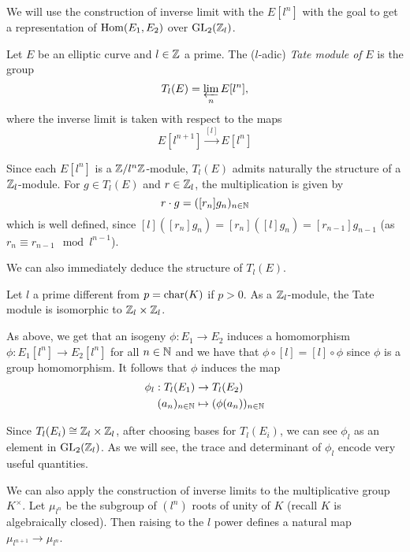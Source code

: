 We will use the construction of inverse limit with the $E[l^n]$
with the goal to get a representation of $\operatorname{Hom}(E_1, E_2)$ over
$\operatorname{GL}_2(\mathbb{Z}_l)$.


\begin{definition}
	Let $E$ be an elliptic curve and $l \in \mathbb{Z}$ a prime.
	The ($l$-adic) \emph{Tate module of} $E$ is the group
	\begin{equation*}
		T_l(E) = \varprojlim_n E[l^n],
	\end{equation*}
	where the inverse limit is taken with respect to the maps
	\begin{equation*}
		E[l^{n+1}]\xrightarrow{[l]} E[l^n]
	\end{equation*}
\end{definition}

Since each $E[l^n]$ is a $\mathbb{Z}/l^n\mathbb{Z}$-module, $T_l(E)$ admits naturally the
structure of a $\mathbb{Z}_l$-module. For $g \in T_l(E)$ and $r \in \mathbb{Z}_l$, the 
multiplication is given by
\begin{equation*}
	r \cdot g = ([r_n]g_n)_{n \in \mathbb{N}}
\end{equation*}
which is well defined, since $[l]([r_n]g_n) = [r_n]([l]g_n) = [r_{n-1}]g_{n-1}$
(as $r_n \equiv r_{n-1} \mod l^{n-1}$).

We can also immediately deduce the structure of $T_l(E)$.


\begin{proposition}
	Let $l$ a prime different from $p = \operatorname{char}(K)$ if $p > 0$.
	As a $\mathbb{Z}_l$-module, the Tate module is isomorphic to $\mathbb{Z}_l \times \mathbb{Z}_l$.
\end{proposition}

As above, we get that an isogeny $\phi: E_1 \to E_2$ induces a homomorphism
$\phi: E_1[l^n] \to E_2[l^n]$ for all $n \in \mathbb{N}$ and we have that
$\phi\circ[l] = [l]\circ\phi$ since $\phi$ is a group homomorphism.
It follows that $\phi$ induces the map
\begin{align*}
	\phi_l: T_l(E_1) &\to T_l(E_2)\\
	(a_n)_{n \in \mathbb{N}} &\mapsto (\phi(a_n))_{n \in \mathbb{N}}
\end{align*}

Since $T_l(E_i) \cong \mathbb{Z}_l\times \mathbb{Z}_l$, after choosing bases for
$T_l(E_i)$, we can see $\phi_l$ as an element in
$\operatorname{GL}_2(\mathbb{Z}_l)$.
As we will see, the trace and determinant of $\phi_l$ encode
very useful quantities. 

We can also apply the construction of inverse limits
to the multiplicative group $K^\times$.
Let $\mu_{l^n}$ be the subgroup of $(l^n)$ roots of unity of $K$
(recall $K$ is algebraically closed). Then raising to the $l$
power defines a natural map $\mu_{l^{n+1}} \to \mu_{l^n}$.

